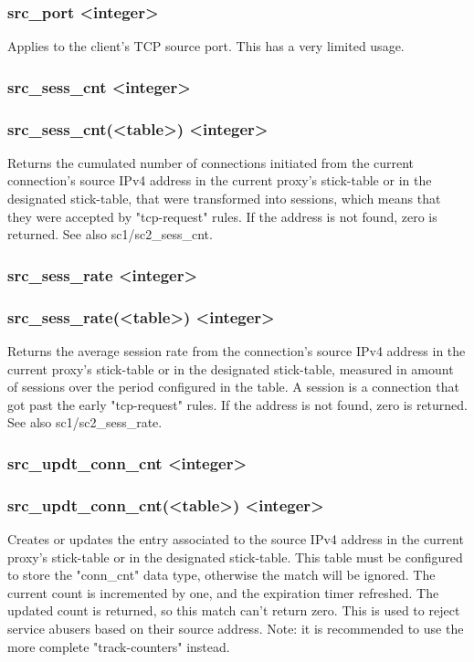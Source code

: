 \subsubsection[src\_port]{src\_port <integer>}
  Applies to the client's TCP source port. This has a very limited usage.

\subsubsection[src\_sess\_cnt]{src\_sess\_cnt <integer>}
\subsubsection*{src\_sess\_cnt(<table>) <integer>}
  Returns the cumulated number of connections initiated from the current
  connection's source IPv4 address in the current proxy's stick-table or in the
  designated stick-table, that were transformed into sessions, which means that
  they were accepted by "tcp-request" rules. If the address is not found, zero
  is returned. See also sc1/sc2\_sess\_cnt.

\subsubsection[src\_sess\_rate]{src\_sess\_rate <integer>}
\subsubsection*{src\_sess\_rate(<table>) <integer>}
  Returns the average session rate from the connection's source IPv4 address in
  the current proxy's stick-table or in the designated stick-table, measured in
  amount of sessions over the period configured in the table. A session is a
  connection that got past the early "tcp-request" rules. If the address is not
  found, zero is returned. See also sc1/sc2\_sess\_rate.

\subsubsection[src\_updt\_conn\_cnt]{src\_updt\_conn\_cnt <integer>}
\subsubsection*{src\_updt\_conn\_cnt(<table>) <integer>}
  Creates or updates the entry associated to the source IPv4 address in the
  current proxy's stick-table or in the designated stick-table. This table
  must be configured to store the "conn\_cnt" data type, otherwise the match
  will be ignored. The current count is incremented by one, and the expiration
  timer refreshed. The updated count is returned, so this match can't return
  zero. This is used to reject service abusers based on their source address.
  Note: it is recommended to use the more complete "track-counters" instead.


